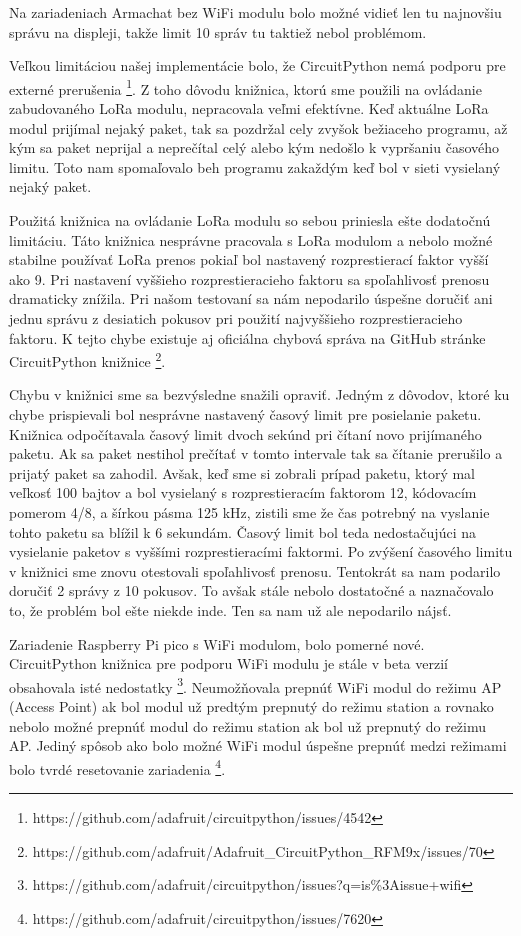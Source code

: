 \documentclass[slovak,master]{diploma}
\begin{document}
Na zariadeniach Armachat bez WiFi modulu bolo možné vidieť len tu najnovšiu správu na displeji, takže limit 10 správ tu taktiež nebol problémom.

Veľkou limitáciou našej implementácie bolo, že CircuitPython nemá podporu pre externé prerušenia \footnote[1]{https://github.com/adafruit/circuitpython/issues/4542}. Z toho dôvodu knižnica, ktorú sme použili na ovládanie zabudovaného LoRa modulu, 
nepracovala veľmi efektívne. Keď aktuálne LoRa modul prijímal nejaký paket, tak sa pozdržal cely zvyšok bežiaceho programu, až kým sa paket neprijal a neprečítal celý alebo kým nedošlo k vypršaniu 
časového limitu. Toto nam spomaľovalo beh programu zakaždým keď bol v sieti vysielaný nejaký paket.

Použitá knižnica na ovládanie LoRa modulu so sebou priniesla ešte dodatočnú limitáciu. Táto knižnica nesprávne pracovala s LoRa modulom a nebolo možné stabilne používať 
LoRa prenos pokiaľ bol nastavený rozprestierací faktor vyšší ako 9. Pri nastavení vyššieho rozprestieracieho faktoru sa spoľahlivosť prenosu dramaticky znížila. Pri 
našom testovaní sa nám nepodarilo úspešne doručiť ani jednu správu z desiatich pokusov pri použití najvyššieho rozprestieracieho faktoru. 
K tejto chybe existuje aj oficiálna chybová správa na GitHub stránke CircuitPython knižnice \footnote[2]{https://github.com/adafruit/Adafruit\_CircuitPython\_RFM9x/issues/70}.

Chybu v knižnici sme sa bezvýsledne snažili opraviť. Jedným z dôvodov, ktoré ku chybe prispievali bol nesprávne nastavený časový limit pre posielanie paketu. Knižnica odpočítavala časový limit dvoch sekúnd 
pri čítaní novo prijímaného paketu. Ak sa paket nestihol prečítať v tomto intervale tak sa čítanie prerušilo a prijatý paket sa zahodil. 
Avšak, keď sme si zobrali prípad paketu, ktorý mal veľkosť 100 bajtov a bol vysielaný s rozprestieracím faktorom 12, kódovacím pomerom 4/8, a šírkou pásma 125 kHz, zistili sme 
že čas potrebný na vyslanie tohto paketu sa blížil k 6 sekundám. Časový limit bol teda nedostačujúci na vysielanie paketov s vyššími rozprestieracími faktormi. Po 
zvýšení časového limitu v knižnici sme znovu otestovali spoľahlivosť prenosu. Tentokrát sa nam podarilo doručiť 2 správy z 10 pokusov. To avšak stále nebolo dostatočné a 
naznačovalo to, že problém bol ešte niekde inde. Ten sa nam už ale nepodarilo nájsť.

Zariadenie Raspberry Pi pico s WiFi modulom, bolo pomerné nové. CircuitPython knižnica pre podporu WiFi modulu je stále v beta verzií obsahovala isté nedostatky \footnote[3]{https://github.com/adafruit/circuitpython/issues?q=is\%3Aissue+wifi}.
Neumožňovala prepnúť WiFi modul do režimu AP (Access Point) ak bol modul už predtým prepnutý do režimu station a rovnako nebolo možné prepnúť modul do režimu station ak bol 
už prepnutý do režimu AP. Jediný spôsob ako bolo možné WiFi modul úspešne prepnúť medzi režimami bolo tvrdé resetovanie zariadenia \footnote[4]{https://github.com/adafruit/circuitpython/issues/7620}.
\end{document}
